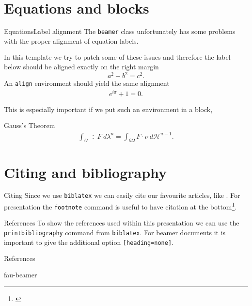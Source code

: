 \documentclass[final]{beamer}
\begin{document}
\section{Equations and blocks}
%
%
%
%
%
\begin{frame}{Equations}{Label alignment}
The \texttt{beamer} class unfortunately has some problems with the proper 
alignment of equation labels.

%
\pause
%
In this template we try to patch some of these issues and therefore the label 
below should be aligned exactly on the right margin
%
\begin{equation}\label{eq:pythagoras}
a^2 + b^2 = c^2.
\end{equation}
%
An \texttt{align} environment should yield the same alignment
%
\begin{align}\label{eq:euler}
e^{i\pi} +1= 0.
\end{align}

This is especially important if we put such an environment in a block,

\begin{block}{Gauss's Theorem}
\begin{align}\label{eq:gauss}
\int_\Omega \div F\ d\lambda^n = \int_{\partial\Omega} F\cdot \nu\ d\mathcal{H}^{n-1}.
\end{align}
\end{block}
\end{frame}
\section{Citing and bibliography}
%
%
%
%
%
\begin{frame}{Citing}
Since we use \texttt{biblatex} we can easily cite our favourite articles, like
\cite{bungert2021bregman, bungert2021neural}. For presentation the \texttt{footnote} command is useful to have citation at the bottom\footnote{\cite{bungert2021bregman}}.
\end{frame}
%
%
%
%
%
\begin{frame}{References}
To show the references used within this presentation we can use the \texttt{printbibliography} command from \texttt{biblatex}. For beamer documents it is important to give the additional option \texttt{[heading=none]}.
%
%
%
%
%
\begin{block}{References}
\printbibliography[heading=none]
\end{block}
\end{frame}
%
%
%
%
%
\begin{frame}{fau-beamer}
%
\end{frame}
\end{document}
